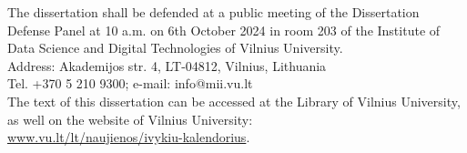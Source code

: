 \vspace{2cm}
\noindent
The dissertation shall be defended at a public meeting of the Dissertation Defense Panel at 10 a.m. on 6th October 2024 in room 203 of the Institute of Data Science and Digital Technologies of Vilnius University.\\
Address: Akademijos str. 4, LT-04812, Vilnius, Lithuania\\ 
Tel. +370 5 210 9300; e-mail: info@mii.vu.lt \\

\vspace{1cm}
\noindent
The text of this dissertation can be accessed at the Library of Vilnius
University, as well on the website of Vilnius University:\\ 
\href{ www.vu.lt/lt/naujienos/ivykiu-kalendorius}{ www.vu.lt/lt/naujienos/ivykiu-kalendorius}.


